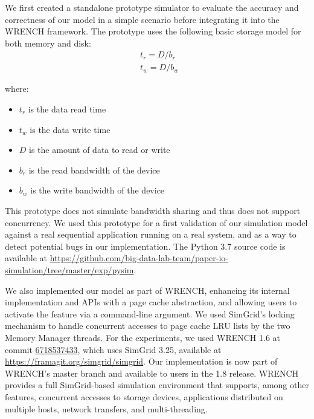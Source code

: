 \documentclass[conference]{IEEEtran}
\newcommand{\simgrid}{SimGrid\xspace}
\newcommand{\wrench}{WRENCH\xspace}
\begin{document}
            We first created a standalone prototype
            simulator to evaluate the accuracy and correctness of our
            model in a simple scenario before integrating it into the
            \wrench framework.
            The prototype uses the following basic storage model for
            both memory and disk:
            \begin{align*}
                & t_{r} = D / b_r \\
                & t_{w} = D / b_w\
            \end{align*}

            where:
            \begin{itemize}
                \item $t_{r}$ is the data read time
                \item $t_{w}$ is the data write time
                \item $D$ is the amount of data to read or write
                \item $b_r$ is the read bandwidth of the device
                \item $b_w$ is the write bandwidth of the device
            \end{itemize}

            This prototype does not simulate  bandwidth sharing and thus
            does not support concurrency. We used
            this prototype for a first validation of our simulation model
            against a real sequential application running on a real system,
            and as a way to detect potential bugs in our implementation.
            The Python 3.7 source code is available at
            \url{https://github.com/big-data-lab-team/paper-io-simulation/tree/master/exp/pysim}.

            We also implemented our model as part of \wrench, enhancing its
            internal implementation and APIs with a page cache abstraction,
            and allowing users to activate the feature via a command-line
            argument. We used SimGrid's locking mechanism to handle
            concurrent accesses to page cache LRU lists by the two Memory
            Manager threads. For the experiments, we used
            \wrench 1.6 at commit
            \href{https://github.com/wrench-project/wrench/tree/67185374330d2c4bf274fce222c937e838df5b03}{6718537433},
            which uses \simgrid 3.25, available at
            \url{https://framagit.org/simgrid/simgrid}. Our implementation
            is now part of \wrench's master branch and available to
            users in the 1.8 release. \wrench provides a full \simgrid-based simulation 
            environment that supports, among other features, concurrent accesses to storage devices, 
            applications distributed on multiple hosts, network transfers, 
            and multi-threading. 
\end{document}
